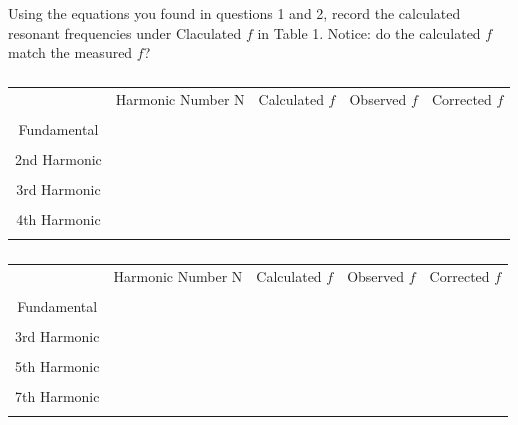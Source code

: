 \documentclass[11pt]{NSF}
\begin{document}
Using the equations you found in questions 1 and 2, record the calculated resonant frequencies under Claculated $f$ in Table 1. Notice: do the calculated $f$ match the measured $f$?

%
\begin{table}[hbtp]
\caption{} \label{t:1}
\begin{tabular}{| c | c | c | c | c |}
\hline
  & Harmonic Number N & Calculated $f$ & Observed $f$ & Corrected $f$ \\ &  &  &  & \\
\hline
 Fundamental &  &  &  &   \\  &  &  &  & \\
\hline
 2nd Harmonic &  &  &  &  \\ &  &  &  & \\
\hline
3rd Harmonic  &  &  &  &  \\ &  &  &  & \\
\hline
 4th Harmonic &  &  &  &  \\ &  &  &  & \\
\hline
\end{tabular}

\caption{} \label{t:2}
\begin{tabular}{| c | c | c | c | c |}
\hline
  & Harmonic Number N & Calculated $f$ & Observed $f$ & Corrected $f$ \\ &  &  &  & \\
\hline
 Fundamental &  &  &  &   \\  &  &  &  & \\
\hline
 3rd Harmonic &  &  &  &  \\ &  &  &  & \\
\hline
5th Harmonic  &  &  &  &  \\ &  &  &  & \\
\hline
7th Harmonic &  &  &  &  \\ &  &  &  & \\
\hline
\end{tabular}
\end{table}
%
\end{document}
